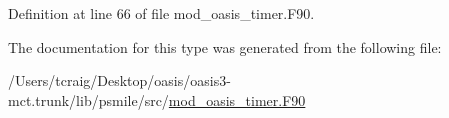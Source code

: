 Definition at line 66 of file mod\+\_\+oasis\+\_\+timer.\+F90.



The documentation for this type was generated from the following file\+:\begin{DoxyCompactItemize}
\item 
/\+Users/tcraig/\+Desktop/oasis/oasis3-\/mct.\+trunk/lib/psmile/src/\hyperlink{mod__oasis__timer_8_f90}{mod\+\_\+oasis\+\_\+timer.\+F90}\end{DoxyCompactItemize}
